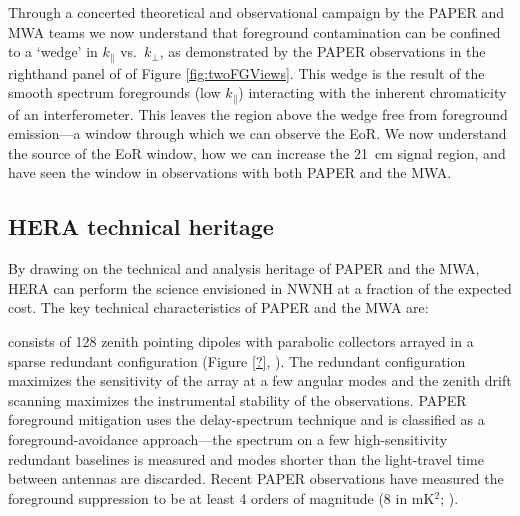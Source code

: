 \documentclass[preprint]{aastex}
\def\kperp{k_{\bot}}
\def\kpar{k_{\|}}
\def\kperp{k_{\bot}}
\def\kpar{k_{\|}}
\begin{document}
Through a concerted theoretical and observational campaign by the PAPER and MWA teams
\citep{morales_et_al2012,parsons_et_al2012b,vedantham_2012,Datta_2010,hazelton_et_al2013,pober_et_al2013,parsons_et_al2013,dillon_et_al2013b}
we now understand that foreground contamination can be confined to a `wedge' in
$\kpar$ vs.\ $\kperp$, as demonstrated by the PAPER observations in the
righthand panel of of Figure \ref{fig:twoFGViews}. 
This wedge is the result of
the smooth spectrum foregrounds 
(low $\kpar$) interacting with the inherent
chromaticity of an interferometer. 
This leaves the region above the wedge free from 
foreground emission---a window through which we can observe the EoR. We now understand the source of the EoR window, how we can increase the 21~cm signal region, and have seen the window in observations with both PAPER and the MWA.

\subsection{HERA technical heritage}
By drawing on the technical and analysis heritage of PAPER and the MWA, HERA can perform the science envisioned in NWNH at a fraction of the expected cost. The key technical characteristics of PAPER and the MWA are:

 consists of 128 zenith pointing dipoles with parabolic collectors arrayed in a sparse redundant configuration (Figure \ref{?}, \citealt{?}). The redundant configuration maximizes the sensitivity of the array at a few angular modes and the zenith drift scanning maximizes the instrumental stability of the observations.  PAPER foreground mitigation uses the delay-spectrum technique and is classified as a foreground-avoidance approach---the spectrum on a few high-sensitivity redundant baselines is measured and modes shorter than the light-travel time between antennas are discarded. Recent PAPER observations
have measured the foreground suppression
to be at least 4 orders of magnitude 
(8 in mK$^2$;
\citealt{parsons_et_al2013}).
\end{document}
